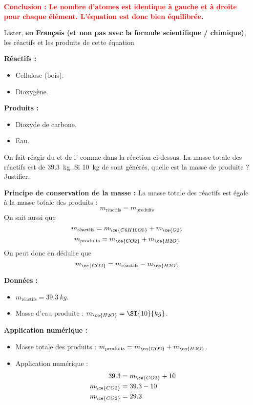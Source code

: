 \documentclass[answers]{exam}
\begin{document}
\begin{questions}
\begin{solution}
    \textcolor{red}{\textbf{Conclusion : Le nombre d'atomes est identique à gauche et à droite pour chaque élément. L'équation est donc bien équilibrée.}}
  \end{solution}

  \question[1] Lister, \textbf{en Français (et non pas avec la formule scientifique / chimique)}, les réactifs et les produits de cette équation

  \begin{solution}
    \textbf{Réactifs :}
    \begin{itemize}[noitemsep]
      \item Cellulose (bois).
      \item Dioxygène.
    \end{itemize}

    \textbf{Produits :}
    \begin{itemize}[noitemsep]
      \item Dioxyde de carbone.
      \item Eau.
    \end{itemize}
  \end{solution}


  \question[1] On fait réagir du  et de l' comme dans la réaction ci-dessus. La masse totale des réactifs est de \SI{39.3}{kg}. Si \SI{10}{kg} de  sont générés, quelle est la masse de  produite ? Justifier. 

  \begin{solution}
    \textbf{Principe de conservation de la masse :}
    La masse totale des réactifs est égale à la masse totale des produits :
    \[
    m_{\text{réactifs}} = m_{\text{produits}}
    \]
    On sait aussi que 
\[
  m_{\text{réactifs}} = m_{\ce{C6H10O5}} +  m_{\ce{O2}}
\]
\[
  m_{\text{produits}} = m_{\ce{CO2}} + m_{\ce{H2O}}
\]
On peut donc en déduire que 
\[
  m_{\ce{CO2}} = m_{\text{réactifs}} - m_{\ce{H2O}}
\]

    \textbf{Données :}
    \begin{itemize}[noitemsep]
      \item $m_{\text{réactifs}} = \SI{39.3}{kg}$.
      \item Masse d'eau produite : $m_{\ce{H2O}} = \SI{10}{kg}$.
    \end{itemize}

    \textbf{Application numérique :}
    \begin{itemize}[noitemsep]
      \item Masse totale des produits : $m_{\text{produits}} = m_{\ce{CO2}} + m_{\ce{H2O}}$.
      \item Application numérique :
      \begin{align*}
        39.3 &= m_{\ce{CO2}} + 10 \\
        m_{\ce{CO2}} &= 39.3 - 10 \\
        m_{\ce{CO2}} &= 29.3
      \end{align*}
    \end{itemize}


\end{solution}
\end{questions}
\end{document}
